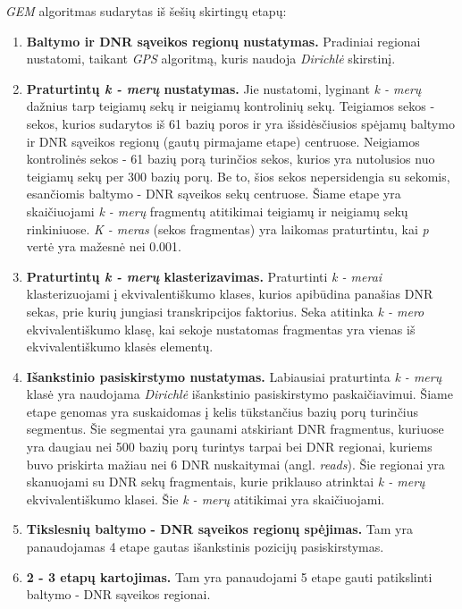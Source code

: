 \documentclass[12pt]{article}
\begin{document}
\emph{GEM} algoritmas sudarytas iš šešių skirtingų etapų\cite{ARTICLE15}:
\begin{enumerate}
    \item \textbf{Baltymo ir DNR sąveikos regionų nustatymas.} Pradiniai
          regionai nustatomi, taikant \emph{GPS} algoritmą\cite{ARTICLE14},
          kuris naudoja \emph{Dirichlė} skirstinį.
    \item \textbf{Praturtintų \emph{k - merų} nustatymas.} Jie nustatomi,
          lyginant \emph{k - merų} dažnius tarp teigiamų sekų ir neigiamų
          kontrolinių sekų. Teigiamos sekos - sekos, kurios sudarytos iš 61
          bazių poros ir yra išsidėsčiusios spėjamų baltymo ir DNR sąveikos
          regionų (gautų pirmajame etape) centruose. Neigiamos kontrolinės
          sekos - 61 bazių porą turinčios sekos, kurios yra nutolusios nuo
          teigiamų sekų per 300 bazių porų. Be to, šios sekos nepersidengia su
          sekomis, esančiomis baltymo - DNR sąveikos sekų centruose. Šiame
          etape yra skaičiuojami \emph{k - merų} fragmentų atitikimai teigiamų
          ir neigiamų sekų rinkiniuose. \emph{K - meras} (sekos fragmentas)
          yra laikomas praturtintu, kai \emph{p} vertė yra mažesnė nei 0.001.
    \item \textbf{Praturtintų \emph{k - merų} klasterizavimas.} Praturtinti
          \emph{k - merai} klasterizuojami į ekvivalentiškumo klases, kurios
          apibūdina panašias DNR sekas, prie kurių jungiasi transkripcijos
          faktorius. Seka atitinka \emph{k - mero} ekvivalentiškumo klasę, kai
          sekoje nustatomas fragmentas yra vienas iš ekvivalentiškumo klasės
          elementų.
    \item \textbf{Išankstinio pasiskirstymo nustatymas.} Labiausiai praturtinta
          \emph{k - merų} klasė yra naudojama \emph{Dirichlė} išankstinio
          pasiskirstymo paskaičiavimui. Šiame etape genomas yra suskaidomas į
          kelis tūkstančius bazių porų turinčius segmentus. Šie segmentai yra
          gaunami atskiriant DNR fragmentus, kuriuose yra daugiau nei 500 bazių
          porų turintys tarpai bei DNR regionai, kuriems buvo priskirta mažiau
          nei 6 DNR nuskaitymai (angl. \emph{reads}). Šie regionai yra
          skanuojami su DNR sekų fragmentais, kurie priklauso atrinktai
          \emph{k - merų} ekvivalentiškumo klasei. Šie \emph{k - merų}
          atitikimai yra skaičiuojami.
    \item \textbf{Tikslesnių baltymo - DNR sąveikos regionų spėjimas.} Tam yra
          panaudojamas 4 etape gautas išankstinis pozicijų pasiskirstymas.
    \item \textbf{2 - 3 etapų kartojimas.} Tam yra panaudojami 5 etape gauti
          patikslinti baltymo - DNR sąveikos regionai.
\end{enumerate}
\end{document}
